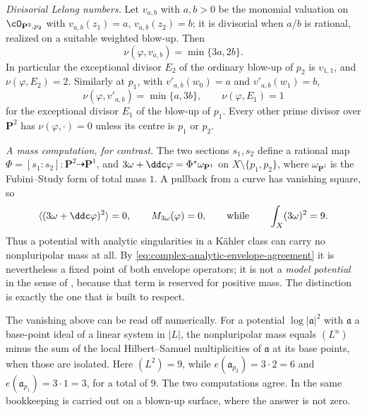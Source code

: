 \begin{example}
\emph{Divisorial Lelong numbers.}  Let \(v_{a,b}\) with \(a,b>0\) be the
monomial valuation on \(\cO_{\mathbf P^2,p_2}\) with
\(v_{a,b}(z_1)=a\), \(v_{a,b}(z_2)=b\); it is divisorial when \(a/b\) is
rational, realized on a suitable weighted blow-up.  Then
\[
 \nu(\varphi,v_{a,b})=\min\{3a,2b\}.
\]
In particular the exceptional divisor \(E_2\) of the ordinary blow-up of
\(p_2\) is \(v_{1,1}\), and \(\nu(\varphi,E_2)=2\).  Similarly at
\(p_1\), with \(v'_{a,b}(w_0)=a\) and \(v'_{a,b}(w_1)=b\),
\[
 \nu(\varphi,v'_{a,b})=\min\{a,3b\},
 \qquad
 \nu(\varphi,E_1)=1
\]
for the exceptional divisor \(E_1\) of the blow-up of \(p_1\).  Every
other prime divisor over \(\mathbf P^2\) has \(\nu(\varphi,\cdot)=0\)
unless its centre is \(p_1\) or \(p_2\).

\emph{A mass computation, for contrast.}  The two sections \(s_1,s_2\)
define a rational map \(\Phi=[s_1:s_2]:\mathbf P^2\dashrightarrow
\mathbf P^1\), and \(3\omega+\ddc\varphi=\Phi^*\omega_{\mathbf P^1}\) on
\(X\setminus\{p_1,p_2\}\), where \(\omega_{\mathbf P^1}\) is the
Fubini--Study form of total mass \(1\).  A pullback from a curve has
vanishing square, so
\[
 \langle(3\omega+\ddc\varphi)^2\rangle=0,
 \qquad
 M_{3\omega}(\varphi)=0,
 \qquad\text{while}\qquad
 \int_X(3\omega)^2=9 .
\]
Thus a potential with analytic singularities in a K\"ahler class can carry
no nonpluripolar mass at all.  By
\eqref{eq:complex-analytic-envelope-agreement} it is nevertheless a fixed
point of both envelope operators; it is not a \emph{model potential} in
the sense of , because that term is reserved
for positive mass.  The distinction is exactly the one that
 is built to respect.
\end{example}

\begin{remark}
\label{rem:ch51-p2-multiplicity}
The vanishing above can be read off numerically.  For a potential
\(\log|\mathfrak a|^2\) with \(\mathfrak a\) a base-point ideal of a
linear system in \(|L|\), the nonpluripolar mass equals
\((L^n)\) minus the sum of the local Hilbert--Samuel multiplicities of
\(\mathfrak a\) at its base points, when those are isolated.  Here
\((L^2)=9\), while
\(e(\mathfrak a_{p_2})=3\cdot2=6\) and
\(e(\mathfrak a_{p_1})=3\cdot1=3\), for a total of \(9\).  The two
computations agree.  In  the same bookkeeping is
carried out on a blown-up surface, where the answer is not zero.
\end{remark}

